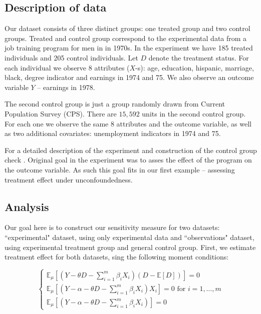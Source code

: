 \documentclass[12pt]{article}
\theoremstyle{plain}
\begin{document}
\subsection{Description of data}

Our dataset consists of three distinct groups: one treated group and two control groups. Treated and control group correspond to the experimental data from a job training program for men in in 1970s. In the experiment we have 185 treated individuals and 205 control individuals. Let $D$ denote the treatment status. For each individual we observe 8 attributes ($X$-s): age, education, hispanic, marriage, black, degree indicator and earnings in 1974 and 75. We also observe an outcome variable $Y$ -- earnings in 1978. 

The second control group is just a group randomly drawn from Current Population Survey (CPS). There are $15,592$ units in the second control group. For each one we observe the same $8$ attributes and the outcome variable, as well as two additional covariates: unemployment indicators in 1974 and 75. 

For a detailed description of the experiment and construction of the control group check \parencite{lalonde1986evaluating}. Original goal in the experiment was to asses the effect of the program on the outcome variable. As such this goal fits in our first example -- assessing treatment effect under unconfoundedness. 

\subsection{ Analysis}

Our goal here is to construct our sensitivity measure for two datasets: ``experimental" dataset, using only experimental data and ``observations" dataset, using experimental treatment group and general control group. First, we estimate treatment effect for both datasets, sing the following moment conditions:

\begin{equation}
\begin{cases}
\mathbb{E}_{\mu}[(Y- \theta D-\sum_{i=1}^m\beta_iX_i)(D-\mathbb{E}[D])]=0\\
\mathbb{E}_{\mu}\left[(Y- \alpha-\theta D-\sum_{i=1}^m\beta_iX_i)X_i\right]=0 \text{  for $i=1,\dots,m$}\\
\mathbb{E}_{\mu}\left[(Y- \alpha-\theta D-\sum_{i=1}^m\beta_iX_i)\right] = 0
\end{cases}
\end{equation}
\end{document}
